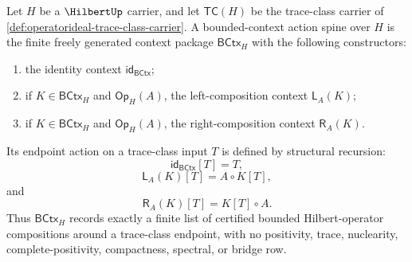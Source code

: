 \begin{definition}
\label{def:operatorideal-bounded-context-action-spine}
Let $H$ be a $\HilbertUp$ carrier, and let $\mathsf{TC}(H)$ be the trace-class carrier of \autoref{def:operatorideal-trace-class-carrier}. A bounded-context action spine over $H$ is the finite freely generated context package $\mathsf{BCtx}_H$ with the following constructors:
\begin{enumerate}
\item the identity context $\mathsf{id}_{\mathsf{BCtx}}$;
\item if $K\in\mathsf{BCtx}_H$ and $\mathsf{Op}_H(A)$, the left-composition context $\mathsf{L}_A(K)$;
\item if $K\in\mathsf{BCtx}_H$ and $\mathsf{Op}_H(A)$, the right-composition context $\mathsf{R}_A(K)$.
\end{enumerate}
Its endpoint action on a trace-class input $T$ is defined by structural recursion:
$$
\mathsf{id}_{\mathsf{BCtx}}[T]=T,
$$
$$
\mathsf{L}_A(K)[T]=A\circ K[T],
$$
and
$$
\mathsf{R}_A(K)[T]=K[T]\circ A.
$$
Thus $\mathsf{BCtx}_H$ records exactly a finite list of certified bounded Hilbert-operator compositions around a trace-class endpoint, with no positivity, trace, nuclearity, complete-positivity, compactness, spectral, or bridge row.
\end{definition}

